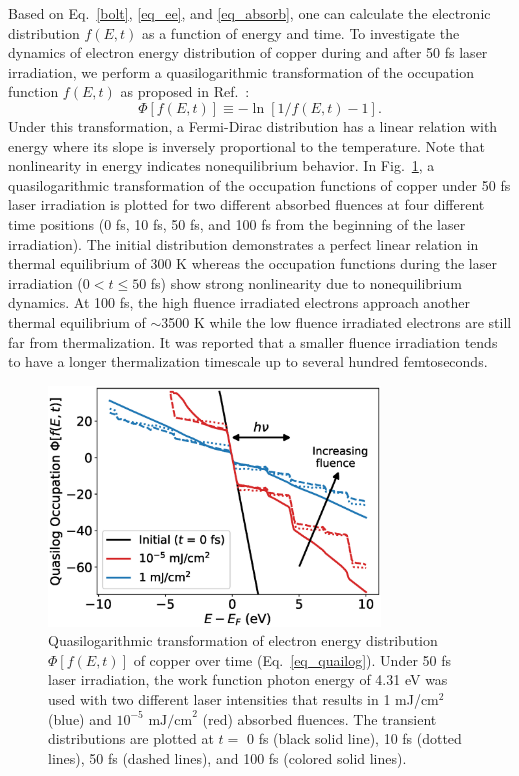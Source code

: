 Based on Eq.~\ref{bolt}, \ref{eq_ee}, and \ref{eq_absorb}, one can calculate the electronic distribution $f(E,t)$ as a function of energy and time.
To investigate the dynamics of electron energy distribution of copper during and after 50 fs laser irradiation, we perform a quasilogarithmic transformation of the occupation function $f(E,t)$ as proposed in Ref.~\cite{skin}:
\begin{equation} \label{eq_quailog}
	\Phi[f(E,t)] \equiv -\ln[1/f(E,t)-1].
\end{equation}
Under this transformation, a Fermi-Dirac distribution has a linear relation with energy where its slope is inversely proportional to the temperature. Note that nonlinearity in energy indicates nonequilibrium behavior. In Fig.~\ref{fig_occupation}, a quasilogarithmic transformation of the occupation functions of copper under 50 fs laser irradiation is plotted for two different absorbed fluences at four different time positions (0 fs, 10 fs, 50 fs, and 100 fs from the beginning of the laser irradiation). The initial distribution demonstrates a perfect linear relation in thermal equilibrium of 300 K whereas the occupation functions during the laser irradiation ($0<t \leq 50$ fs) show strong nonlinearity due to nonequilibrium dynamics. At 100 fs, the high fluence irradiated electrons approach another thermal equilibrium of $\sim$3500 K while the low fluence irradiated electrons are still far from thermalization. It was reported that a smaller fluence irradiation tends to have a longer thermalization timescale up to several hundred femtoseconds.\cite{boltzmann}

\begin{figure}
	\centering
	\includegraphics*[width=250pt]{figs/boltzmann/occupation.eps}
	\caption{Quasilogarithmic transformation of electron energy distribution $\Phi[f(E,t)]$ of copper over time (Eq.~\ref{eq_quailog}).  Under 50 fs laser irradiation, the work function photon energy of 4.31 eV was used with two different laser intensities that results in 1 mJ/cm$^2$ (blue) and $10^{-5} \textrm{ mJ/cm}^2$ (red) absorbed fluences. The transient distributions are plotted at $t=$ 0 fs (black solid line), 10 fs (dotted lines), 50 fs (dashed lines), and 100 fs (colored solid lines).}
	\label{fig_occupation}
\end{figure}

